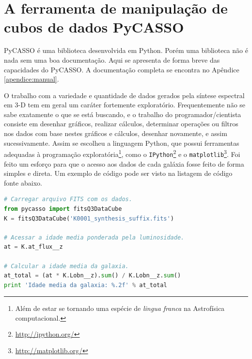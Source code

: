 
\section{A ferramenta de manipulação de cubos de dados PyCASSO}
\label{sec:pycasso:Pycasso}

PyCASSO é uma biblioteca desenvolvida em Python. Porém uma biblioteca não é nada
sem uma boa documentação. Aqui se apresenta de forma breve das capacidades do
PyCASSO. A documentação completa se encontra no Apêndice \ref{apendice:manual}.

O trabalho com a variedade e quantidade de dados gerados pela síntese espectral
em 3-D tem em geral um caráter fortemente exploratório. Frequentemente não se
sabe exatamente o que se está buscando, e o trabalho do programador/cientista
consiste em desenhar gráficos, realizar cálculos, determinar operações ou
filtros nos dados com base nestes gráficos e cálculos, desenhar novamente, e
assim sucessivamente. Assim se escolheu a linguagem Python, que possui
ferramentas adequadas à programação exploratória\footnote{Além de estar se
tornando uma espécie de {\em lingua franca} na Astrofísica computacional.}, como
o \texttt{IPython}\footnote{\url{http://ipython.org/}} e o
\texttt{matplotlib}\footnote{\url{http://matplotlib.org/}}. Foi feito um esforço
para que o acesso aos dados de cada galáxia fosse feito de forma simples e
direta. Um exemplo de código pode ser visto na listagem de código fonte abaixo.

\begin{lstlisting}[language=Python, label={lst:dataAccess}, caption={Exemplo de
acesso aos dados. Todas as propriedades estão disponíveis diretamente pelo nome,
inclusive utilizando a função autocompletar da maioria dos ambientes de
desenvolvimento Python.}]
# Carregar arquivo FITS com os dados.
from pycasso import fitsQ3DataCube
K = fitsQ3DataCube('K0001_synthesis_suffix.fits')

# Acessar a idade media ponderada pela luminosidade.
at = K.at_flux__z

# Calcular a idade media da galaxia.
at_total = (at * K.Lobn__z).sum() / K.Lobn__z.sum()
print 'Idade media da galaxia: %.2f' % at_total
\end{lstlisting}

